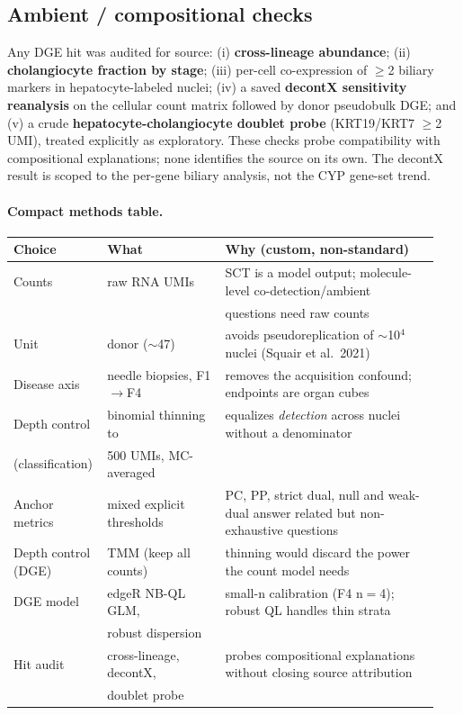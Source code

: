 \documentclass[11pt,a4paper]{article}
\begin{document}
\subsection{Ambient / compositional checks}

Any DGE hit was audited for source: (i) \textbf{cross-lineage abundance}; (ii) \textbf{cholangiocyte fraction by stage}; (iii) per-cell co-expression of $\ge$2 biliary markers in hepatocyte-labeled nuclei; (iv) a saved \textbf{decontX sensitivity reanalysis} on the cellular count matrix followed by donor pseudobulk DGE; and (v) a crude \textbf{hepatocyte-cholangiocyte doublet probe} (KRT19/KRT7 $\ge$2 UMI), treated explicitly as exploratory. These checks probe compatibility with compositional explanations; none identifies the source on its own. The decontX result is scoped to the per-gene biliary analysis, not the CYP gene-set trend.

\paragraph{Compact methods table.}
\begin{table}[H]
\centering\small
\begin{tabular}{@{}>{\raggedright\arraybackslash}p{0.18\linewidth}>{\raggedright\arraybackslash}p{0.27\linewidth}>{\raggedright\arraybackslash}p{0.49\linewidth}@{}}
\toprule
Choice & What & Why (custom, non-standard) \\
\midrule
Counts & raw RNA UMIs & SCT is a model output; molecule-level co-detection/ambient \\
 & & questions need raw counts \\
Unit & donor ($\sim$47) & avoids pseudoreplication of $\sim$10$^4$ nuclei (Squair et al.\ 2021) \\
Disease axis & needle biopsies, F1$\to$F4 & removes the acquisition confound; endpoints are organ cubes \\
Depth control & binomial thinning to & equalizes \emph{detection} across nuclei without a denominator \\
(classification) & 1{,}500 UMIs, MC-averaged & \\
Anchor metrics & mixed explicit thresholds & PC, PP, strict dual, null and weak-dual answer related but non-exhaustive questions \\
Depth control (DGE) & TMM (keep all counts) & thinning would discard the power the count model needs \\
DGE model & edgeR NB-QL GLM, & small-n calibration (F4 n$=$4); robust QL handles thin strata \\
 & robust dispersion & \\
Hit audit & cross-lineage, decontX, & probes compositional explanations without closing source attribution \\
 & doublet probe & \\
\bottomrule
\end{tabular}
\end{table}
\end{document}
